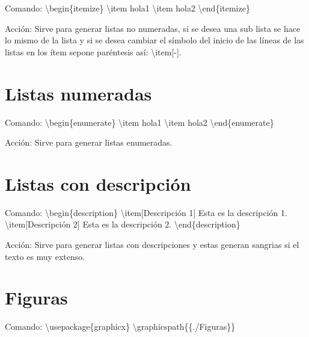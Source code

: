\documentclass[a4paper,11pt]{article}
\begin{document}
\begin{flushleft}
		Comando: \textbackslash begin\{itemize\}\newline
		\textbackslash item hola1\newline
		\textbackslash item hola2\newline
		\textbackslash end\{itemize\}\newline
		
		Acción: Sirve para generar listas no numeradas, si se desea una sub lista se hace lo mismo de la lista y si se desea cambiar el símbolo del inicio de las líneas de las listas en los ítem sepone paréntesis así: \textbackslash item[-].\newline
		
		\section{Listas numeradas}
		
		Comando: \textbackslash begin\{enumerate\}\newline
		\textbackslash item hola1\newline
		\textbackslash item hola2\newline
		\textbackslash end\{enumerate\}\newline
		
		Acción: Sirve para generar listas enumeradas.\newline
		
		\section{Listas con descripción}
		
		Comando: \textbackslash begin\{description\}\newline
		\textbackslash item[Descripción 1] Esta es la descripción 1.\newline
		\textbackslash item[Descripción 2] Esta es la descripción 2.\newline
		\textbackslash end\{description\}\newline
		
		Acción: Sirve para generar listas con descripciones y estas generan sangrias si el texto es muy extenso.\newline
		
		\section{Figuras}
		
		Comando: \textbackslash usepackage\{graphicx\}\newline
		\textbackslash graphicspath\{\{./Figuras\}\}\newline
		

\end{flushleft}
\end{document}
